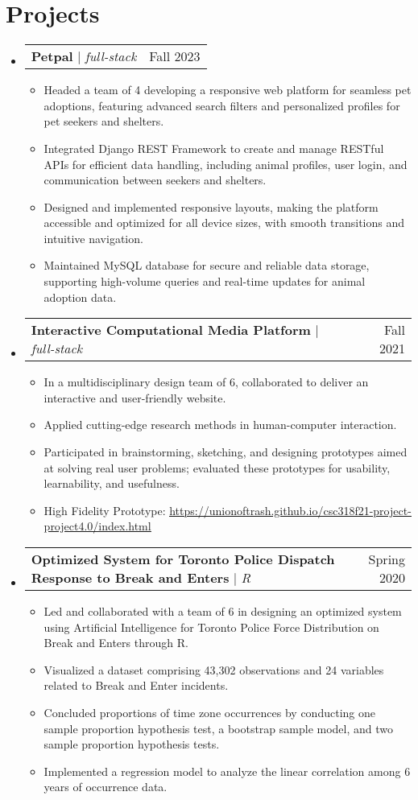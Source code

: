 \documentclass[letterpaper,11pt]{article}
\makeatletter
\newcommand{\resumeItem}[1]{
  \item\small{
    {#1 \vspace{-2pt}}
  }
}
\newcommand{\resumeProjectHeading}[2]{
    \item
    \begin{tabular*}{0.97\textwidth}{l@{\extracolsep{\fill}}r}
      \small#1 & #2 \\
    \end{tabular*}\vspace{-7pt}
}
\newcommand{\resumeSubHeadingListStart}{\begin{itemize}[leftmargin=0.15in, label={}]}
\newcommand{\resumeSubHeadingListEnd}{\end{itemize}}
\newcommand{\resumeItemListStart}{\begin{itemize}}
\newcommand{\resumeItemListEnd}{\end{itemize}\vspace{-5pt}}
\makeatother
\begin{document}
\section{Projects}
    \resumeSubHeadingListStart
      \resumeProjectHeading
          {\textbf{Petpal } $|$ \emph{full-stack}}{Fall 2023}
          \resumeItemListStart
            \resumeItem{Headed a team of 4 developing a responsive web platform for seamless pet adoptions, featuring advanced search filters and personalized profiles for pet seekers and shelters.}
            \resumeItem{Integrated Django REST Framework to create and manage RESTful APIs for efficient data handling, including animal profiles, user login, and communication between seekers and shelters.}
            \resumeItem{Designed and implemented responsive layouts, making the platform accessible and optimized for all device sizes, with smooth transitions and intuitive navigation.}
            \resumeItem{Maintained MySQL database for secure and reliable data storage, supporting high-volume queries and real-time updates for animal adoption data.}
          \resumeItemListEnd
      \resumeProjectHeading
          {\textbf{Interactive Computational Media Platform } $|$ \emph{full-stack	}}{Fall 2021}
          \resumeItemListStart
            \resumeItem{In a multidisciplinary design team of 6, collaborated to deliver an interactive and user-friendly website.}
            \resumeItem{Applied cutting-edge research methods in human-computer interaction.}
            \resumeItem{Participated in brainstorming, sketching, and designing prototypes aimed at solving real user problems; evaluated these prototypes for usability, learnability, and usefulness.}
            \resumeItem{High Fidelity Prototype: \href{https://unionoftrash.github.io/csc318f21-project-project4.0/index.html}{\underline{https://unionoftrash.github.io/csc318f21-project-project4.0/index.html}}}
          \resumeItemListEnd
        \resumeProjectHeading
        {\textbf{Optimized System for Toronto Police Dispatch Response to Break and Enters} $|$ \emph{R}}{Spring 2020}
          \resumeItemListStart
            \resumeItem{Led and collaborated with a team of 6 in designing an optimized system using Artificial Intelligence for Toronto Police Force Distribution on Break and Enters through R.}
            \resumeItem{Visualized a dataset comprising 43,302 observations and 24 variables related to Break and Enter incidents.}
            \resumeItem{Concluded proportions of time zone occurrences by conducting one sample proportion hypothesis test, a bootstrap sample model, and two sample proportion hypothesis tests.}
            \resumeItem{Implemented a regression model to analyze the linear correlation among 6 years of occurrence data.}
          \resumeItemListEnd
    \resumeSubHeadingListEnd
\end{document}
